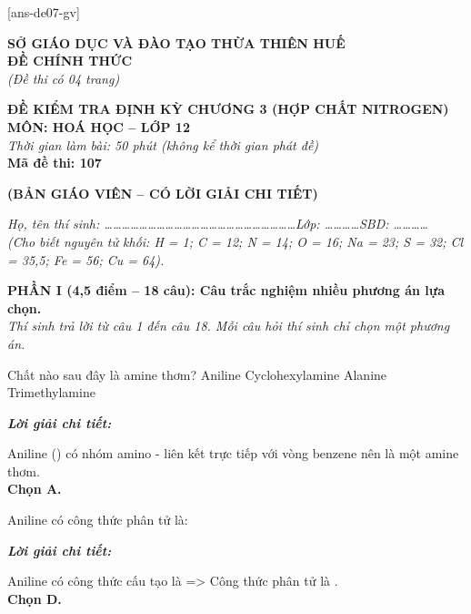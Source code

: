 \documentclass[11pt,a4paper]{article}
\def\loigiai#1{
\par\begingroup\color{blue!80!black}\small
\noindent\textbf{\textit{Lời giải chi tiết:}}\par
#1\par\endgroup}
\begin{document}
[ans-de07-gv]

\noindent
\begin{minipage}[t]{0.48\textwidth}
	\centering
	\textbf{SỞ GIÁO DỤC VÀ ĐÀO TẠO THỪA THIÊN HUẾ}\\
	\textbf{ĐỀ CHÍNH THỨC}\\
	\textit{(Đề thi có 04 trang)}
\end{minipage}\hfill
\begin{minipage}[t]{0.48\textwidth}
	\centering
	\textbf{\color{mainGreen}ĐỀ KIỂM TRA ĐỊNH KỲ CHƯƠNG 3 (HỢP CHẤT NITROGEN)}\\
	\textbf{MÔN: HOÁ HỌC -- LỚP 12}\\
	\textit{Thời gian làm bài: 50 phút (không kể thời gian phát đề)}\\
	\textbf{Mã đề thi: 107}
\end{minipage}


\vspace{0.1cm}
\begin{center}
	\textbf{\color{hfRed}\Large (BẢN GIÁO VIÊN -- CÓ LỜI GIẢI CHI TIẾT)}
\end{center}

\vspace{0.1cm}
\noindent\textit{Họ, tên thí sinh: \dots\dots\dots\dots\dots\dots\dots\dots\dots\dots\dots\dots\dots\dots\dots\dots\dots\dots\dots\dots\dots\dots Lớp: \dots\dots\dots\dots SBD: \dots\dots\dots\dots}\\
\noindent\textit{(Cho biết nguyên tử khối: H = 1; C = 12; N = 14; O = 16; Na = 23; S = 32; Cl = 35,5; Fe = 56; Cu = 64).}

\vspace{0.15cm}
\noindent
\textbf{PHẦN I (4,5 điểm -- 18 câu): Câu trắc nghiệm nhiều phương án lựa chọn.}\\
\textit{Thí sinh trả lời từ câu 1 đến câu 18. Mỗi câu hỏi thí sinh chỉ chọn một phương án.}

\setcounter{ex}{0}

\begin{ex}
Chất nào sau đây là amine thơm?
\choice
{\True Aniline}
{Cyclohexylamine}
{Alanine}
{Trimethylamine}
\loigiai{
Aniline () có nhóm amino - liên kết trực tiếp với vòng benzene nên là một amine thơm.\\
\textbf{Chọn A.}}
\end{ex}

\begin{ex}
Aniline có công thức phân tử là:
\choice
{}
{}
{}
{\True {}}
\loigiai{
Aniline có công thức cấu tạo là  => Công thức phân tử là \ce{C6H7N}.\\
\textbf{Chọn D.}}
\end{ex}
\end{document}

